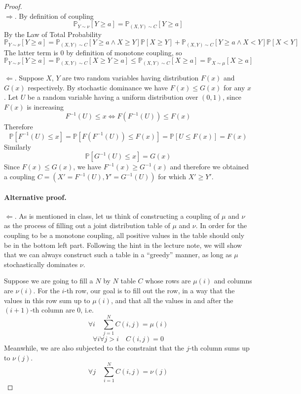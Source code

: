         \begin{proof}
            ~{}\\
            $\Rightarrow$.
            By definition of coupling
            \[ \mathbb{P}_{Y\sim\nu}[Y \ge a] = \mathbb{P}_{(X,Y)\sim C}[Y\ge a] \]
            By the Law of Total Probability
            \[ \mathbb{P}_{Y\sim\nu}[Y \ge a] = \mathbb{P}_{(X,Y)\sim C}[Y \ge a \wedge X \ge Y]\mathbb{P}[X \ge Y] + \mathbb{P}_{(X,Y)\sim C}[Y \ge a \wedge X < Y]\mathbb{P}[X < Y] \]
            The latter term is $0$ by definition of monotone coupling, so
            \[ \mathbb{P}_{Y\sim\nu}[Y \ge a] = \mathbb{P}_{(X,Y)\sim C}[X \ge Y \ge a] \le \mathbb{P}_{(X,Y)\sim C}[X \ge a] = \mathbb{P}_{X\sim\mu}[X \ge a] \]

            $\Leftarrow$. Suppose $X$, $Y$ are two random variables having  distribution $F(x)$ and $G(x)$ respectively. By stochastic dominance we have $F(x) \le G(x)$ for any $x$. Let $U$ be a random variable having a uniform distribution over $(0,1)$, since $F(x)$ is increasing
            \[ F^{-1}(U) \le x \Leftrightarrow F(F^{-1}(U)) \le F(x) \]
            Therefore
            \[ \mathbb{P}[F^{-1}(U) \le x] = \mathbb{P}[F(F^{-1}(U)) \le F(x)] = \mathbb{P}[U \le F(x)] = F(x) \]
            Similarly
            \[ \mathbb{P}[G^{-1}(U) \le x] = G(x) \]
            Since $F(x) \le G(x)$, we have $F^{-1}(x) \ge G^{-1}(x)$ and therefore we obtained a coupling $C = (X' = F^{-1}(U), Y' = G^{-1}(U))$ for which $X' \ge Y'$.

            \paragraph{Alternative proof.} $\Leftarrow$. As is mentioned in class, let us think of constructing a coupling of $\mu$ and $\nu$ as the process of filling out a joint distribution table of $\mu$ and $\nu$. In order for the coupling to be a monotone coupling, all positive values in the table should only be in the bottom left part. Following the hint in the lecture note, we will show that we can always construct such a table in a ``greedy'' manner, as long as $\mu$ stochastically dominates $\nu$.
    
            Suppose we are going to fill a $N$ by $N$ table $C$ whose rows are $\mu(i)$ and columns are $\nu(i)$.
            For the $i$-th row, our goal is to fill out the row, in a way that the values in this row sum up to $\mu(i)$, and that all the values in and after the $(i+1)$-th column are $0$, i.e.
            \begin{equation}\label{Eq:constr1}
                \forall i \quad \sum_{j=1}^N C(i, j) = \mu(i)
            \end{equation}
            \begin{equation}\label{Eq:constr2}
                \forall i \forall j > i \quad C(i, j) = 0
            \end{equation}
            Meanwhile, we are also subjected to the constraint that the $j$-th column sums up to $\nu(j)$.
            \begin{equation}\label{Eq:constr3}
                \forall j \quad \sum_{i=1}^N C(i,j) = \nu(j)
            \end{equation}
            

\end{proof}
